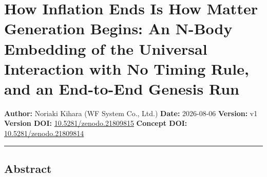 \documentclass[
  a4paper,
]{article}
\author{}
\date{}
\begin{document}
\section{How Inflation Ends Is How Matter Generation Begins: An N-Body
Embedding of the Universal Interaction with No Timing Rule, and an
End-to-End Genesis
Run}\label{how-inflation-ends-is-how-matter-generation-begins-an-n-body-embedding-of-the-universal-interaction-with-no-timing-rule-and-an-end-to-end-genesis-run}

\textbf{Author:} Noriaki Kihara (WF System Co., Ltd.) \textbf{Date:}
2026-08-06 \textbf{Version:} v1 \textbf{Version DOI:}
\href{https://doi.org/10.5281/zenodo.21809815}{10.5281/zenodo.21809815}
\textbf{Concept DOI:}
\href{https://doi.org/10.5281/zenodo.21809814}{10.5281/zenodo.21809814}

\begin{center}\rule{0.5\linewidth}{0.5pt}\end{center}

\subsection{Abstract}\label{abstract}
\end{document}
